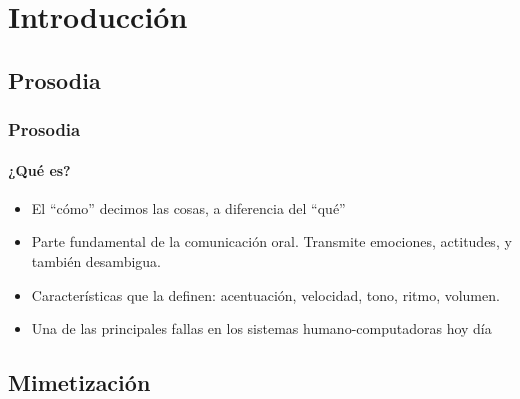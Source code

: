 \section{Introducción}

\subsection{Prosodia}

\begin{frame}
  \frametitle{Prosodia}
  \framesubtitle{¿Qué es?}
  \begin{itemize}
    \item El ``cómo'' decimos las cosas, a diferencia del ``qué''
    \item Parte fundamental de la comunicación oral. Transmite emociones, actitudes, y también desambigua.
    \item Características que la definen: acentuación, velocidad, tono, ritmo, volumen.
    \item Una de las principales fallas en los sistemas humano-computadoras hoy día
  \end{itemize}

  \vfill
\end{frame}


\subsection{Mimetización}


